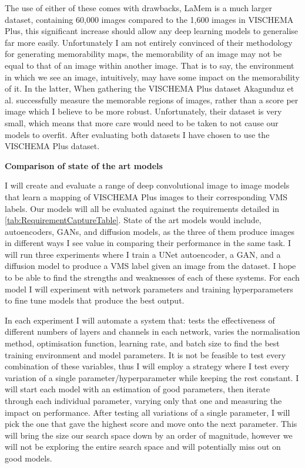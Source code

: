 \documentclass{UoYCSproject}
\begin{document}
The use of either of these comes with drawbacks, LaMem is a much larger dataset, containing 60,000 images compared to the 1,600 images in VISCHEMA Plus, this significant increase should allow any deep learning models to generalise far more easily. Unfortunately I am not entirely convinced of their methodology for generating memorability maps, the memorability of an image may not be equal to that of an image within another image. That is to say, the environment in which we see an image, intuitively, may have some impact on the memorability of it. In the latter, 
When gathering the VISCHEMA Plus dataset  Akagunduz et al. successfully measure the memorable regions of images, rather than a score per image which I believe to be more robust. Unfortunately, their dataset is very small, which means that more care would need to be taken to not cause our models to overfit. After evaluating both datasets I have chosen to use the VISCHEMA Plus dataset. 

\textbf{Comparison of state of the art models}

I will create and evaluate a range of deep convolutional image to image models that learn a mapping of VISCHEMA Plus images to their corresponding VMS labels. Our models will all be evaluated against the requirements detailed in \ref{tab:RequirementCaptureTable}. State of the art models would include, autoencoders, GANs, and diffusion models, as the three of them produce images in different ways I see value in comparing their performance in the same task. I will run three experiments where I train a UNet autoencoder, a GAN, and a diffusion model to produce a VMS label given an image from the dataset. I hope to be able to find the strengths and weaknesses of each of these systems. For each model I will experiment with network parameters and training hyperparameters to fine tune models that produce the best output.

In each experiment I will automate a system that: tests the effectiveness of different numbers of layers and channels in each network, varies the normalisation method, optimisation function, learning rate, and batch size to find the best training environment and model parameters. It is not be feasible to test every combination of these variables, thus I will employ a strategy where I test every variation of a single parameter/hyperparameter while keeping the rest constant. I will start each model with an estimation of good parameters, then iterate through each individual parameter, varying only that one and measuring the impact on performance. After testing all variations of a single parameter, I will pick the one that gave the highest score and move onto the next parameter. This will bring the size our search space down by an order of magnitude, however we will not be exploring the entire search space and will potentially miss out on good models. 
\end{document}
